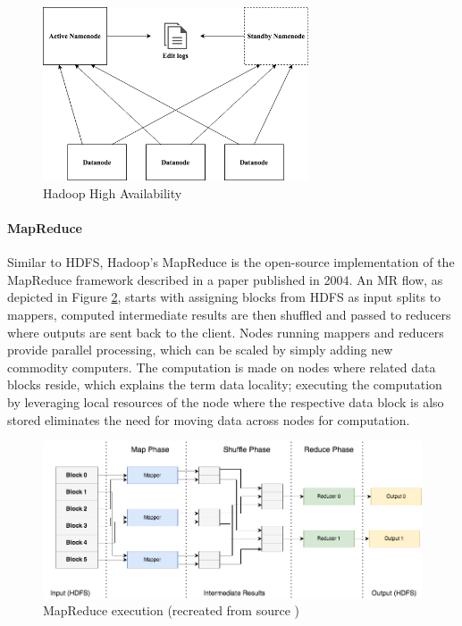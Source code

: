 \documentclass[review]{elsarticle}
\begin{document}
\begin{figure}[h!]
	\caption{Hadoop High Availability}
	\label{fig:HadoopHA}
	\includegraphics[width=0.7\textwidth]{HadoopHA}
	\centering
\end{figure}

\paragraph{MapReduce} 
Similar to HDFS, Hadoop's MapReduce is the open-source implementation of the MapReduce framework described in a paper \cite{dean_mapreduce_2004} published in 2004. An MR flow, as depicted in Figure \ref{fig:MapReduce}, starts with assigning blocks from HDFS as input splits to mappers, computed intermediate results are then shuffled and passed to reducers where outputs are sent back to the client. Nodes running mappers and reducers provide parallel processing, which can be scaled by simply adding new commodity computers. The computation is made on nodes where related data blocks reside, which explains the term data locality; executing the computation by leveraging local resources of the node where the respective data block is also stored eliminates the need for moving data across nodes for computation.

\begin{figure}[h!]
	\caption{MapReduce execution (recreated from source \cite{schatzle_giant_nodate})}
	\label{fig:MapReduce}
	\includegraphics[width=\textwidth]{MapReduce}
	\centering
\end{figure}
\end{document}

